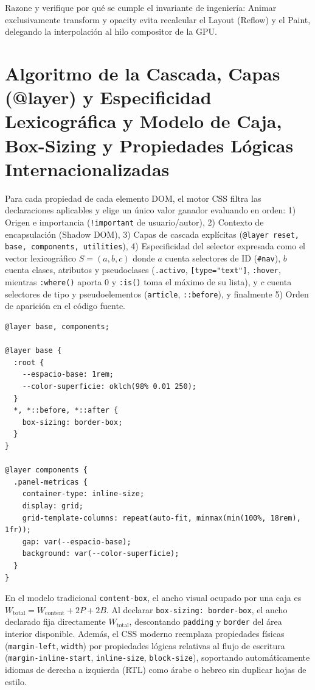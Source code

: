 \documentclass{book}
\begin{document}
\begin{tcolorbox}[title={Autoficha}, studiumcheck, breakable]

Razone y verifique por qué se cumple el invariante de ingeniería: Animar exclusivamente transform y opacity evita recalcular el Layout (Reflow) y el Paint, delegando la interpolación al hilo compositor de la GPU.
\end{tcolorbox}

\section{Algoritmo de la Cascada, Capas (@layer) y Especificidad Lexicográfica y Modelo de Caja, Box-Sizing y Propiedades Lógicas Internacionalizadas}

Para cada propiedad de cada elemento DOM, el motor CSS filtra las declaraciones aplicables y elige un único valor ganador evaluando en orden: 1) Origen e importancia (\texttt{!important} de usuario/autor), 2) Contexto de encapsulación (Shadow DOM), 3) Capas de cascada explícitas (\texttt{@layer reset, base, components, utilities}), 4) Especificidad del selector expresada como el vector lexicográfico \(S = (a, b, c)\) donde \(a\) cuenta selectores de ID (\texttt{\#nav}), \(b\) cuenta clases, atributos y pseudoclases (\texttt{.activo}, \texttt{[type="text"]}, \texttt{:hover}, mientras \texttt{:where()} aporta 0 y \texttt{:is()} toma el máximo de su lista), y \(c\) cuenta selectores de tipo y pseudoelementos (\texttt{article}, \texttt{::before}), y finalmente 5) Orden de aparición en el código fuente.
\begin{lstlisting}[style=studium]
@layer base, components;

@layer base {
  :root {
    --espacio-base: 1rem;
    --color-superficie: oklch(98% 0.01 250);
  }
  *, *::before, *::after {
    box-sizing: border-box;
  }
}

@layer components {
  .panel-metricas {
    container-type: inline-size;
    display: grid;
    grid-template-columns: repeat(auto-fit, minmax(min(100%, 18rem), 1fr));
    gap: var(--espacio-base);
    background: var(--color-superficie);
  }
}
\end{lstlisting}
En el modelo tradicional \texttt{content-box}, el ancho visual ocupado por una caja es \(W_{\text{total}} = W_{\text{content}} + 2P + 2B\). Al declarar \texttt{box-sizing: border-box}, el ancho declarado fija directamente \(W_{\text{total}}\), descontando \texttt{padding} y \texttt{border} del área interior disponible. Además, el CSS moderno reemplaza propiedades físicas (\texttt{margin-left}, \texttt{width}) por propiedades lógicas relativas al flujo de escritura (\texttt{margin-inline-start}, \texttt{inline-size}, \texttt{block-size}), soportando automáticamente idiomas de derecha a izquierda (RTL) como árabe o hebreo sin duplicar hojas de estilo.
\end{document}
